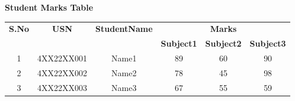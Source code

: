 \documentclass[a4paper,12pt]{article}
\begin{document}
\begin{center}
\textbf{Student Marks Table}
\end{center}

\vspace{0.5cm}

\begin{tabular}{|c|c|c|c|c|c|}
\hline
\textbf{S.No} & \textbf{USN} & \textbf{StudentName} & \multicolumn{3}{c|}{\textbf{Marks}} \\
\cline{4-6}
 & & & \textbf{Subject1} & \textbf{Subject2} & \textbf{Subject3} \\
\hline
1 & 4XX22XX001 & Name1 & 89 & 60 & 90 \\
\hline
2 & 4XX22XX002 & Name2 & 78 & 45 & 98 \\
\hline
3 & 4XX22XX003 & Name3 & 67 & 55 & 59 \\
\hline
\end{tabular}
\end{document}
